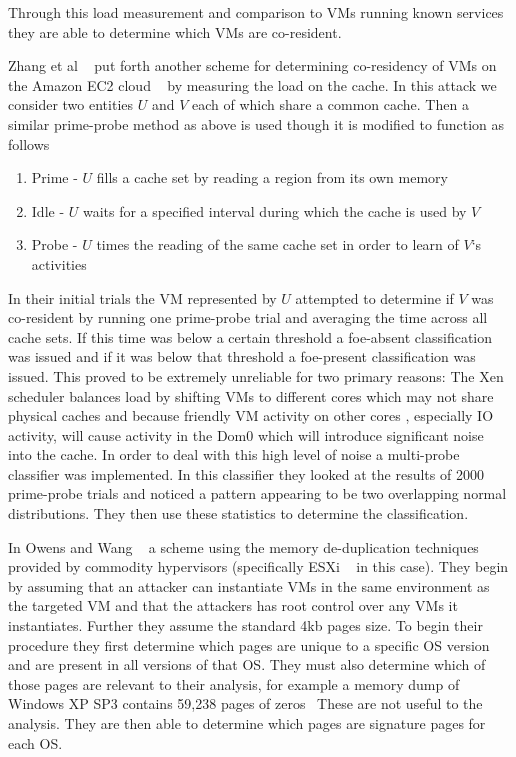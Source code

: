 Through this load measurement and comparison to VMs running known services they are able to determine which VMs are co-resident. 

Zhang et al ~\cite{zhang_cross-vm_2012} put forth another scheme for determining co-residency of VMs on the Amazon EC2 cloud ~\cite{_aws_EC2_2014} by measuring the load on the cache. In this attack we consider two entities $U$ and $V$ each of which share a common cache. Then a similar prime-probe method as above is used though it is modified to function as follows

\begin{enumerate}
	\item Prime - $U$ fills a cache set by reading a region from its own memory
	\item Idle - $U$ waits for a specified interval during which the cache is used by $V$
	\item Probe - $U$ times the reading of the same cache set in order to learn of $V$`s activities
\end{enumerate}


In their initial trials the VM represented by $U$ attempted to determine if $V$ was co-resident by running one prime-probe trial and averaging the time across all cache sets. If this time was below a certain threshold a foe-absent classification was issued and if it was below that threshold a foe-present classification was issued. This proved to be extremely unreliable for two primary reasons: The Xen scheduler balances load by shifting VMs to different cores which may not share physical caches and because friendly VM activity on other cores , especially IO activity, will cause activity in the Dom0 which will introduce significant noise into the cache. In order to deal with this high level of noise a multi-probe classifier was implemented. In this classifier they looked at the results of 2000 prime-probe trials and noticed a pattern appearing to be two overlapping normal distributions. They then use these statistics to determine the classification. 

In Owens and Wang ~\cite{owens_non-interactive_2011} a scheme using the memory de-duplication techniques provided by commodity hypervisors (specifically ESXi ~\cite{chaubal_architecture_2008} in this case). They begin by assuming that an attacker can instantiate VMs in the same environment as the targeted VM and that the attackers has root control over any VMs it instantiates. Further they assume the standard 4kb pages size. To begin their procedure they first determine which pages are unique to a specific OS version and are present in all versions of that OS. They must also determine which of those pages are relevant to their analysis, for example a memory dump of Windows XP SP3 contains 59,238 pages of zeros~\cite{owens_non-interactive_2011} These are not useful to the analysis. They are then able to determine which pages are signature pages for each OS. 

